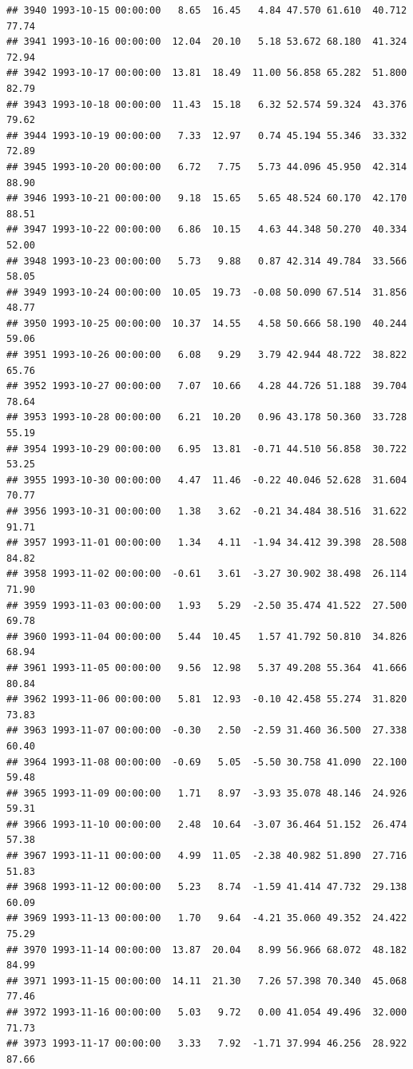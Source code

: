 \documentclass{article}\usepackage{graphicx, color}
\makeatletter
\newenvironment{kframe}{%
 \def\at@end@of@kframe{}%
 \ifinner\ifhmode%
  \def\at@end@of@kframe{\end{minipage}}%
  \begin{minipage}{\columnwidth}%
 \fi\fi%
 \def\FrameCommand##1{\hskip\@totalleftmargin \hskip-\fboxsep
 \colorbox{shadecolor}{##1}\hskip-\fboxsep
     \hskip-\linewidth \hskip-\@totalleftmargin \hskip\columnwidth}%
 \MakeFramed {\advance\hsize-\width
   \@totalleftmargin\z@ \linewidth\hsize
   \@setminipage}}%
 {\par\unskip\endMakeFramed%
 \at@end@of@kframe}
\newenvironment{knitrout}{}{} %
\makeatother
\begin{document}
\begin{knitrout}
\begin{kframe}
\begin{verbatim}
## 3940 1993-10-15 00:00:00   8.65  16.45   4.84 47.570 61.610  40.712  77.74
## 3941 1993-10-16 00:00:00  12.04  20.10   5.18 53.672 68.180  41.324  72.94
## 3942 1993-10-17 00:00:00  13.81  18.49  11.00 56.858 65.282  51.800  82.79
## 3943 1993-10-18 00:00:00  11.43  15.18   6.32 52.574 59.324  43.376  79.62
## 3944 1993-10-19 00:00:00   7.33  12.97   0.74 45.194 55.346  33.332  72.89
## 3945 1993-10-20 00:00:00   6.72   7.75   5.73 44.096 45.950  42.314  88.90
## 3946 1993-10-21 00:00:00   9.18  15.65   5.65 48.524 60.170  42.170  88.51
## 3947 1993-10-22 00:00:00   6.86  10.15   4.63 44.348 50.270  40.334  52.00
## 3948 1993-10-23 00:00:00   5.73   9.88   0.87 42.314 49.784  33.566  58.05
## 3949 1993-10-24 00:00:00  10.05  19.73  -0.08 50.090 67.514  31.856  48.77
## 3950 1993-10-25 00:00:00  10.37  14.55   4.58 50.666 58.190  40.244  59.06
## 3951 1993-10-26 00:00:00   6.08   9.29   3.79 42.944 48.722  38.822  65.76
## 3952 1993-10-27 00:00:00   7.07  10.66   4.28 44.726 51.188  39.704  78.64
## 3953 1993-10-28 00:00:00   6.21  10.20   0.96 43.178 50.360  33.728  55.19
## 3954 1993-10-29 00:00:00   6.95  13.81  -0.71 44.510 56.858  30.722  53.25
## 3955 1993-10-30 00:00:00   4.47  11.46  -0.22 40.046 52.628  31.604  70.77
## 3956 1993-10-31 00:00:00   1.38   3.62  -0.21 34.484 38.516  31.622  91.71
## 3957 1993-11-01 00:00:00   1.34   4.11  -1.94 34.412 39.398  28.508  84.82
## 3958 1993-11-02 00:00:00  -0.61   3.61  -3.27 30.902 38.498  26.114  71.90
## 3959 1993-11-03 00:00:00   1.93   5.29  -2.50 35.474 41.522  27.500  69.78
## 3960 1993-11-04 00:00:00   5.44  10.45   1.57 41.792 50.810  34.826  68.94
## 3961 1993-11-05 00:00:00   9.56  12.98   5.37 49.208 55.364  41.666  80.84
## 3962 1993-11-06 00:00:00   5.81  12.93  -0.10 42.458 55.274  31.820  73.83
## 3963 1993-11-07 00:00:00  -0.30   2.50  -2.59 31.460 36.500  27.338  60.40
## 3964 1993-11-08 00:00:00  -0.69   5.05  -5.50 30.758 41.090  22.100  59.48
## 3965 1993-11-09 00:00:00   1.71   8.97  -3.93 35.078 48.146  24.926  59.31
## 3966 1993-11-10 00:00:00   2.48  10.64  -3.07 36.464 51.152  26.474  57.38
## 3967 1993-11-11 00:00:00   4.99  11.05  -2.38 40.982 51.890  27.716  51.83
## 3968 1993-11-12 00:00:00   5.23   8.74  -1.59 41.414 47.732  29.138  60.09
## 3969 1993-11-13 00:00:00   1.70   9.64  -4.21 35.060 49.352  24.422  75.29
## 3970 1993-11-14 00:00:00  13.87  20.04   8.99 56.966 68.072  48.182  84.99
## 3971 1993-11-15 00:00:00  14.11  21.30   7.26 57.398 70.340  45.068  77.46
## 3972 1993-11-16 00:00:00   5.03   9.72   0.00 41.054 49.496  32.000  71.73
## 3973 1993-11-17 00:00:00   3.33   7.92  -1.71 37.994 46.256  28.922  87.66

\end{verbatim}
\end{kframe}
\end{knitrout}
\end{document}

